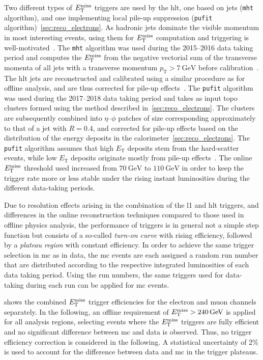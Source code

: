 Two different types of $E_{\textrm{T}}^{\textrm{miss}}$ triggers are used by the \gls{hlt}, one based on jets (\texttt{mht} algorithm), and one implementing local pile-up suppression (\texttt{pufit} algorithm)~\cref{sec:reco_electrons}.
As hadronic jets dominate the visible momentum in most interesting events, using them for $E_{\textrm{T}}^{\textrm{miss}}$ computation and triggering is well-motivated~\cite{Aad:2020les}.
The \texttt{mht} algorithm was used during the 2015--2016 data taking period and computes the $E_{\textrm{T}}^{\textrm{miss}}$ from the negative vectorial sum of the transverse momenta of all jets with a transverse momentum $p_\mathrm{T} > \SI{7}{\GeV}$ before calibration~\cite{Aad:2020les}.
The \gls{hlt} jets are reconstructed and calibrated using a similar procedure as for offline analysis, and are thus corrected for pile-up effects~\cite{Aad:2016nrq}.
The \texttt{pufit} algorithm was used during the 2017--2018 data taking period and takes as input topo clusters formed using the method described in~\cref{sec:reco_electrons}.
The clusters are subsequently combined into $\eta$--$\phi$ patches of size corresponding approximately to that of a jet with $R=0.4$, and corrected for pile-up effects based on the distribution of the energy deposits in the calorimeter~\cref{sec:reco_electrons}.
The \texttt{pufit} algorithm assumes that high $E_\mathrm{T}$ deposits stem from the hard-scatter events, while low $E_\mathrm{T}$ deposits originate mostly from pile-up effects~\cite{Aad:2020les}.
The online $E_{\textrm{T}}^{\textrm{miss}}$ threshold used increased from $\SI{70}{\GeV}$ to $\SI{110}{\GeV}$ in order to keep the trigger rate more or less stable under the rising instant luminosities during the different data-taking periods.  

Due to resolution effects arising in the combination of the \gls{l1} and \gls{hlt} triggers, and differences in the online reconstruction techniques compared to those used in offline physics analysis, the performance of triggers is in general not a simple step function but consists of a so-called \textit{turn-on curve} with rising efficiency, followed by a \textit{plateau region} with constant efficiency.
In order to achieve the same trigger selection in \gls{mc} as in data, the \gls{mc} events are each assigned a random run number that are distributed according to the respective integrated luminosities of each data taking period.
Using the run numbers, the same triggers used for data-taking during each run can be applied for \gls{mc} events. 

 shows the combined $E_{\textrm{T}}^{\textrm{miss}}$ trigger efficiencies for the electron and muon channels separately.
In the following, an offline requirement of $\etmiss > \SI{240}{\GeV}$ is applied for all analysis regions, selecting events where the $E_{\textrm{T}}^{\textrm{miss}}$ triggers are fully efficient and no significant difference between \gls{mc} and data is observed.
Thus, no trigger efficiency correction is considered in the following. A statistical uncertainty of 2\% is used to account for the difference between data and \gls{mc} in the trigger plateaus.


